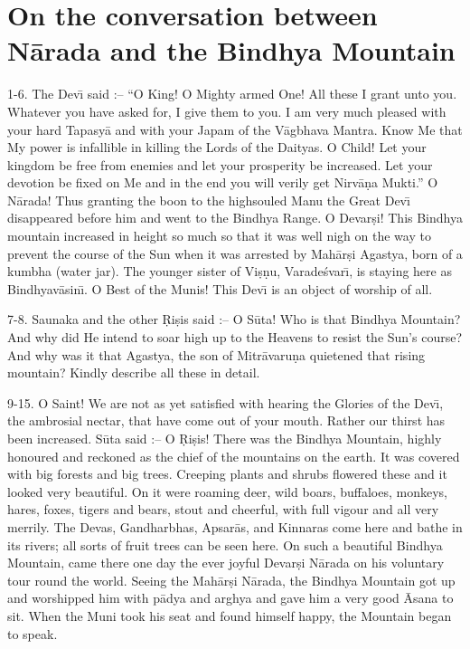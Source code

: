 \chapter{On the conversation between N\=arada and the Bindhya Mountain}

1-6. The Dev\={\i} said :-- ``O King! O Mighty armed One! All these I grant unto you. Whatever you have asked for, I give them to you. I am very much pleased with your hard Tapasy\=a and with your Japam of the V\=agbhava Mantra. Know Me that My power is infallible in killing the Lords of the Daityas. O Child! Let your kingdom be free from enemies and let your prosperity be increased. Let your devotion be fixed on Me and in the end you will verily get Nirv\=a\d{n}a Mukti.'' O N\=arada! Thus granting the boon to the highsouled Manu the Great Dev\={\i} disappeared before him and went to the Bindhya Range. O Devar\d{s}i! This Bindhya mountain increased in height so much so that it was well nigh on the way to prevent the course of the Sun when it was arrested by Mah\=ar\d{s}i Agastya, born of a kumbha (water jar). The younger sister of Vi\d{s}\d{n}u, Varade\'svar\={\i}, is staying here as Bindhyav\=asin\={\i}. O Best of the Munis! This Dev\={\i} is an object of worship of all.

7-8. Saunaka and the other \d{R}i\d{s}is said :-- O S\=uta! Who is that Bindhya Mountain? And why did He intend to soar high up to the Heavens to resist the Sun's course? And why was it that Agastya, the son of Mitr\=avaru\d{n}a quietened that rising mountain? Kindly describe all these in detail.

9-15. O Saint! We are not as yet satisfied with hearing the Glories of the Dev\={\i}, the ambrosial nectar, that have come out of your mouth. Rather our thirst has been increased. S\=uta said :-- O \d{R}i\d{s}is! There was the Bindhya Mountain, highly honoured and reckoned as the chief of the mountains on the earth. It was covered with big forests and big trees. Creeping plants and shrubs flowered these and it looked very beautiful. On it were roaming deer, wild boars, buffaloes, monkeys, hares, foxes, tigers and bears, stout and cheerful, with full vigour and all very merrily. The Devas, Gandharbhas, Apsar\=as, and Kinnaras come here and bathe in its rivers; all sorts of fruit trees can be seen here. On such a beautiful Bindhya Mountain, came there one day the ever joyful Devar\d{s}i N\=arada on his voluntary tour round the world. Seeing the Mah\=ar\d{s}i N\=arada, the Bindhya Mountain got up and worshipped him with p\=adya and arghya and gave him a very good \=Asana to sit. When the Muni took his seat and found himself happy, the Mountain began to speak.

